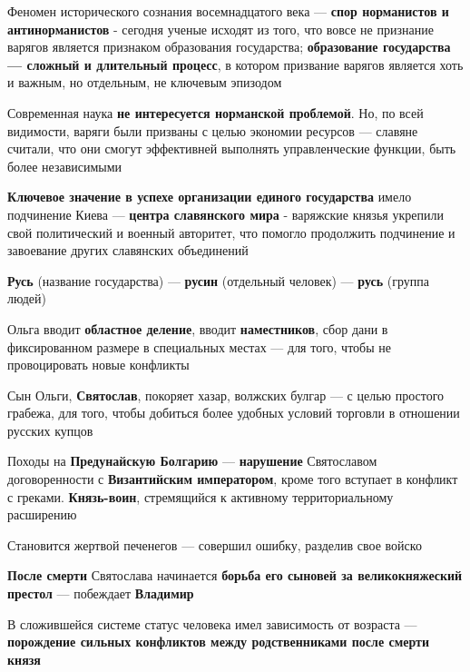 \documentclass{article}
\begin{document}
\hfill

Феномен исторического сознания восемнадцатого века — \textbf{спор норманистов и антинорманистов} - сегодня ученые исходят из того, что вовсе не признание варягов является признаком образования государства; \textbf{образование государства — сложный и длительный процесс}, в котором призвание варягов является хоть и важным, но отдельным, не ключевым эпизодом

Современная наука \textbf{не интересуется норманской проблемой}. Но, по всей видимости, варяги были призваны с целью экономии ресурсов — славяне считали, что они смогут эффективней выполнять управленческие функции, быть более независимыми

\hfill

\textbf{Ключевое значение в успехе организации единого государства} имело подчинение Киева — \textbf{центра славянского мира} - варяжские князья укрепили свой политический и военный авторитет, что помогло продолжить подчинение и завоевание других славянских объединений

\textbf{Русь} (название государства) — \textbf{русин} (отдельный человек) — \textbf{русь} (группа людей)

Ольга вводит \textbf{областное деление}, вводит \textbf{наместников}, сбор дани в фиксированном размере в специальных местах — для того, чтобы не провоцировать новые конфликты

Сын Ольги, \textbf{Святослав}, покоряет хазар, волжских булгар — с целью простого грабежа, для того, чтобы добиться более удобных условий торговли в отношении русских купцов

\hfill

Походы на \textbf{Предунайскую Болгарию} — \textbf{нарушение} Святославом договоренности с \textbf{Византийским императором}, кроме того вступает в конфликт с греками. \textbf{Князь-воин}, стремящийся к активному территориальному расширению

Становится жертвой печенегов — совершил ошибку, разделив свое войско

\hfill

\textbf{После смерти} Святослава начинается \textbf{борьба его сыновей за великокняжеский престол} — побеждает \textbf{Владимир}

В сложившейся системе статус человека имел зависимость от возраста — \textbf{порождение сильных конфликтов между родственниками после смерти князя}
\end{document}
